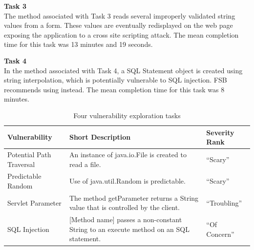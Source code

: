 \documentclass[10pt,journal,compsoc]{IEEEtran}
\begin{document}
\noindent\textbf{Task 3} \\
The method associated with Task 3 reads several improperly validated string values from a form. 
These values are eventually redisplayed on the web page exposing the application to a cross site scripting attack. 
The mean completion time for this task was 13 minutes and 19 seconds.

\noindent\textbf{Task 4} \\
In the method associated with Task 4, a SQL Statement object is created using string interpolation, which is potentially vulnerable to SQL injection. FSB recommends using   instead. The mean completion time for this task was 8 minutes.
\\

\begin{table} 
	\centering
	\caption{Four vulnerability exploration tasks}
	\begin{tabularx}{\textwidth}{|l|X|l|}
		\rowcolor{gray!50}
		\hline
		Vulnerability				& Short Description													& Severity Rank 	\\
		\hline	
		Potential Path Traversal	& An instance of java.io.File is created to read a file.     			& ``Scary''	    \\
		\hline
		Predictable Random			& Use of java.util.Random is predictable. 								& ``Scary''		\\
		\hline
		Servlet Parameter 			& The method getParameter returns a String value that is controlled by the client.			& ``Troubling''	\\
		\hline
		SQL Injection				& [Method name] passes a non-constant String to an execute method on an SQL statement.     	& ``Of Concern'' \\
		\hline
	\end{tabularx}
	\label{table:vulnerabilities}
\end{table}
\end{document}

